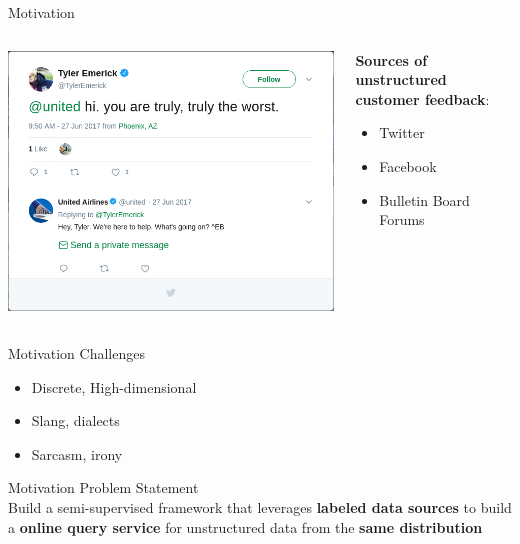 \documentclass[aspectratio=169]{beamer}
\begin{document}
\begin{frame}{Motivation}

	\begin{columns}[T] %
		\begin{column}{.45\textwidth}
			\includegraphics[width=.9\textwidth]{images/TylerEmerick_status_879743676385079296.png}
		\end{column}
		\hfill
		\begin{column}{.45\textwidth}
			\textbf{Sources of unstructured customer feedback}:
			\begin{itemize}
				\item Twitter
				\item Facebook
				\item Bulletin Board Forums
			\end{itemize}
		\end{column}
	\end{columns}
\end{frame}

\begin{frame}{Motivation}
	\centering
	{\Huge Challenges} \\
	\vspace{1cm}
	\begin{center}
		\begin{minipage}{0.4\textwidth}
			\begin{itemize}
				\item Discrete, High-dimensional
				\item Slang, dialects
				\item Sarcasm, irony
			\end{itemize}
		\end{minipage}
	\end{center}
\end{frame}

\begin{frame}{Motivation}
	\centering
	{\Huge Problem Statement} \\
	\vspace{1cm}
	{\Large Build a semi-supervised framework that leverages \textbf{labeled data sources} to build a \textbf{online query service} for unstructured data from the \textbf{same distribution}}
\end{frame}
\end{document}
